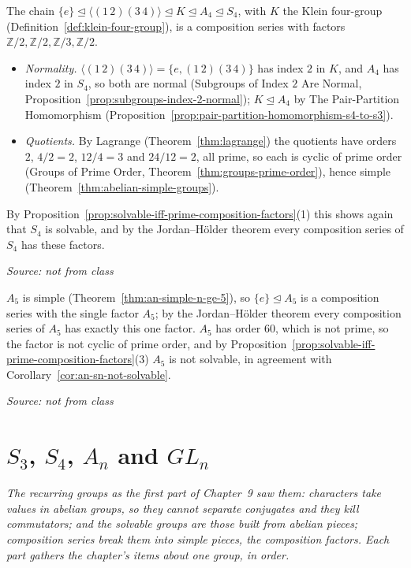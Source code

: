 \documentclass[11pt]{report}
\newcommand{\srcline}[1]{\par\hfill{\footnotesize\textit{Source: #1}}}
\begin{document}
\begin{exbox}\label{ex:composition-series-s4}
The chain $\{e\} \trianglelefteq \langle (1\,2)(3\,4) \rangle \trianglelefteq K \trianglelefteq A_4 \trianglelefteq S_4$, with $K$ the Klein four-group (Definition~\ref{def:klein-four-group}), is a composition series with factors $\mathbb{Z}/2, \mathbb{Z}/2, \mathbb{Z}/3, \mathbb{Z}/2$.
\begin{itemize}[nosep]
    \item \emph{Normality.} $\langle (1\,2)(3\,4) \rangle = \{e, (1\,2)(3\,4)\}$ has index $2$ in $K$, and $A_4$ has index $2$ in $S_4$, so both are normal (Subgroups of Index $2$ Are Normal, Proposition~\ref{prop:subgroups-index-2-normal}); $K \trianglelefteq A_4$ by The Pair-Partition Homomorphism (Proposition~\ref{prop:pair-partition-homomorphism-s4-to-s3}).
    \item \emph{Quotients.} By Lagrange (Theorem~\ref{thm:lagrange}) the quotients have orders $2$, $4/2 = 2$, $12/4 = 3$ and $24/12 = 2$, all prime, so each is cyclic of prime order (Groups of Prime Order, Theorem~\ref{thm:groups-prime-order}), hence simple (Theorem~\ref{thm:abelian-simple-groups}).
\end{itemize}
By Proposition~\ref{prop:solvable-iff-prime-composition-factors}(1) this shows again that $S_4$ is solvable, and by the Jordan--H\"older theorem every composition series of $S_4$ has these factors.
\srcline{not from class}
\end{exbox}

\begin{exbox}\label{ex:composition-factor-a5}
$A_5$ is simple (Theorem~\ref{thm:an-simple-n-ge-5}), so $\{e\} \trianglelefteq A_5$ is a composition series with the single factor $A_5$; by the Jordan--H\"older theorem every composition series of $A_5$ has exactly this one factor. $A_5$ has order $60$, which is not prime, so the factor is not cyclic of prime order, and by Proposition~\ref{prop:solvable-iff-prime-composition-factors}(3) $A_5$ is not solvable, in agreement with Corollary~\ref{cor:an-sn-not-solvable}.
\srcline{not from class}
\end{exbox}

\section{\texorpdfstring{$S_3$, $S_4$, $A_n$ and $GL_n$}{S₃, S₄, Aₙ and GLₙ}}\label{sec:rev-ch9}

\textit{The recurring groups as the first part of Chapter~9 saw them: characters take values in abelian groups, so they cannot separate conjugates and they kill commutators; and the solvable groups are those built from abelian pieces; composition series break them into simple pieces, the composition factors. Each part gathers the chapter's items about one group, in order.}
\end{document}
